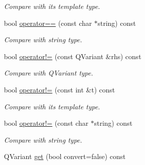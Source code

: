 \begin{DoxyCompactItemize}
\begin{DoxyCompactList}\small\item\em Compare with its template type. \item\end{DoxyCompactList}\item 
\hypertarget{classDQField_a77d0bd4973c3b15fcb352ce58f371394}{
bool \hyperlink{classDQField_a77d0bd4973c3b15fcb352ce58f371394}{operator==} (const char $\ast$string) const}
\label{classDQField_a77d0bd4973c3b15fcb352ce58f371394}

\begin{DoxyCompactList}\small\item\em Compare with string type. \item\end{DoxyCompactList}\item 
\hypertarget{classDQField_a08325fc85199eb54268f8753b0e9668b}{
bool \hyperlink{classDQField_a08325fc85199eb54268f8753b0e9668b}{operator!=} (const QVariant \&rhs) const}
\label{classDQField_a08325fc85199eb54268f8753b0e9668b}

\begin{DoxyCompactList}\small\item\em Compare with QVariant type. \item\end{DoxyCompactList}\item 
\hypertarget{classDQField_a3938d43781be5c4b3f8db191e0be8ea3}{
bool \hyperlink{classDQField_a3938d43781be5c4b3f8db191e0be8ea3}{operator!=} (const int \&t) const}
\label{classDQField_a3938d43781be5c4b3f8db191e0be8ea3}

\begin{DoxyCompactList}\small\item\em Compare with its template type. \item\end{DoxyCompactList}\item 
\hypertarget{classDQField_a6713be2b5fa4a2937265be13bbf4eb56}{
bool \hyperlink{classDQField_a6713be2b5fa4a2937265be13bbf4eb56}{operator!=} (const char $\ast$string) const}
\label{classDQField_a6713be2b5fa4a2937265be13bbf4eb56}

\begin{DoxyCompactList}\small\item\em Compare with string type. \item\end{DoxyCompactList}\item 
\hypertarget{classDQField_a17e36ac914ae0dd938f081f9ade514c7}{
QVariant \hyperlink{classDQField_a17e36ac914ae0dd938f081f9ade514c7}{get} (bool convert=false) const}
\label{classDQField_a17e36ac914ae0dd938f081f9ade514c7}


\end{DoxyCompactItemize}

